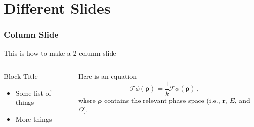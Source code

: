 \documentclass[fleqn]{beamer}
\begin{document}
    \section{Different Slides} %
    \begin{frame}
        \frametitle{Column Slide}
        This is how to make a 2 column slide
        \begin{columns}[c]
            \begin{column}{0.5\textwidth} %
                \begin{block}{Block Title}
                    \begin{itemize}
                        \item Some list of things
                        \item More things
                    \end{itemize}
                \end{block}
            \end{column}
            
            \begin{column}{0.5\textwidth} %
                Here is an equation
                \begin{equation}
                    \mathcal{T} \phi(\bm{\rho}) = \frac{1}{k} \mathcal{F} \phi(\bm{\rho}) \, , \nonumber
                \end{equation}
                where $\bm{\rho}$ contains the relevant phase space (i.e., $\mathbf{r}$, $E$, and $\Omega$).
            \end{column}
        \end{columns}
    \end{frame}
    
\end{document}
